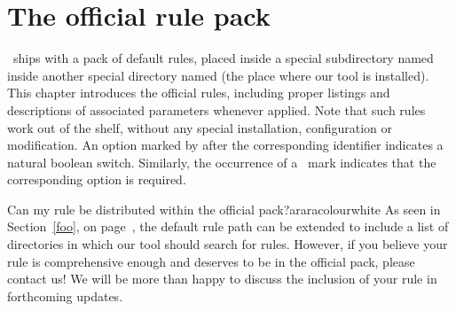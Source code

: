 \chapter{The official rule pack}
\label{chap:theofficialrulepack}

\arara\ ships with a pack of default rules, placed inside a special subdirectory named  inside another special directory named  (the place where our tool is installed). This chapter introduces the official rules, including proper listings and descriptions of associated parameters whenever applied. Note that such rules work out of the shelf, without any special installation, configuration or modification. An option marked by  after the corresponding identifier indicates a natural boolean switch. Similarly, the occurrence of a \rqbox\ mark indicates that the corresponding option is required.

\begin{messagebox}{Can my rule be distributed within the official pack?}{araracolour}{\icok}{white}
As seen in Section~\ref{foo}, on page~\pageref{foo}, the default rule path can be extended to include a list of directories in which our tool should search for rules. However, if you believe your rule is comprehensive enough and deserves to be in the official pack, please contact us! We will be more  than happy to discuss the inclusion of your rule in forthcoming updates.
\end{messagebox}


